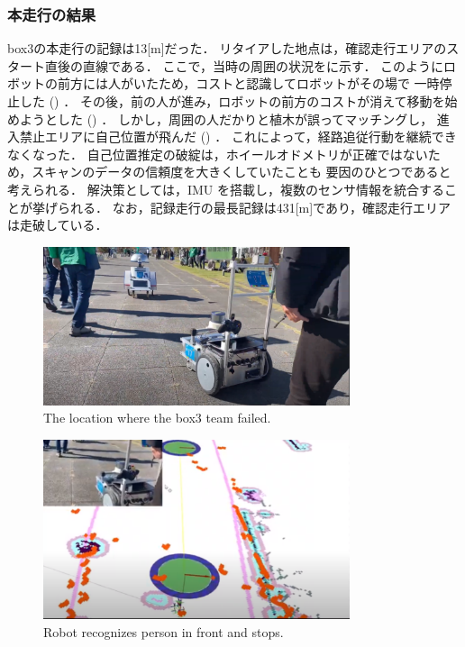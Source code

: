 \documentclass[twocolumn, 9pt]{jsproceedings}
\begin{document}
\subsubsection{本走行の結果}
box3の本走行の記録は13[m]だった．
リタイアした地点は，確認走行エリアのスタート直後の直線である．
ここで，当時の周囲の状況をに示す．
このようにロボットの前方には人がいたため，コストと認識してロボットがその場で
一時停止した () ．
その後，前の人が進み，ロボットの前方のコストが消えて移動を始めようとした () ． 
しかし，周囲の人だかりと植木が誤ってマッチングし，
進入禁止エリアに自己位置が飛んだ () ．
これによって，経路追従行動を継続できなくなった．
自己位置推定の破綻は，ホイールオドメトリが正確ではないため，スキャンのデータの信頼度を大きくしていたことも
要因のひとつであると考えられる．
解決策としては，IMU を搭載し，複数のセンサ情報を統合することが挙げられる．
なお，記録走行の最長記録は431[m]であり，確認走行エリアは走破している．

\begin{figure}[H]
  \centering
  \includegraphics[width=90mm]{fig/human.pdf}
  \caption{The location where the box3 team failed.}
  \label{fig:box3-human}
\end{figure}

\begin{figure}[H]
  \centering
  \includegraphics[width=90mm]{fig/box3_1.pdf}
  \caption{Robot recognizes person in front and stops.}
  \label{fig:box3-result-1}
\end{figure}
\end{document}

